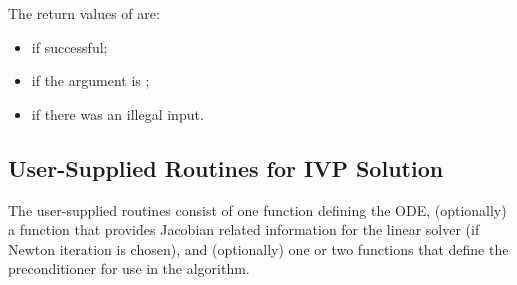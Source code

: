 \begin{itemize}
  The return values of  are:
  \begin{itemize}
  \item {} if successful;
  \item {} if the  argument is ;
  \item {} if there was an illegal input.
  \end{itemize}         

\end{itemize}

                                                                 
\subsection{User-Supplied Routines for IVP Solution}\label{ss:user_fct_sim}

The user-supplied routines consist of one function defining the ODE, 
(optionally) a function that provides Jacobian related information for the linear 
solver (if Newton iteration is chosen), and (optionally) one or two functions 
that define the preconditioner for use in the {\spgmr} algorithm. 

